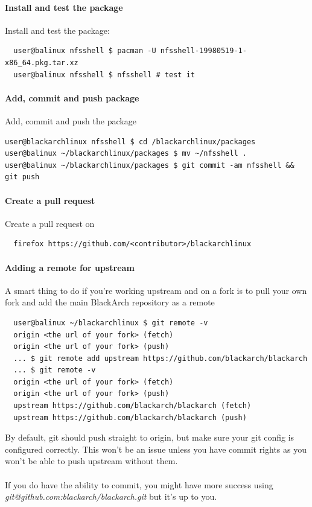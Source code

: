 \documentclass[a4paper, oneside,12pt]{scrartcl}
\def\href#1#2{\htmladdnormallink{#2}{#1}}
\begin{document}
\paragraph{Install and test the package}
Install and test the package:
\begin{lstlisting}
  user@balinux nfsshell $ pacman -U nfsshell-19980519-1-x86_64.pkg.tar.xz
  user@balinux nfsshell $ nfsshell # test it
\end{lstlisting}

\paragraph{Add, commit and push package}
Add, commit and push the package
\begin{lstlisting}user@blackarchlinux nfsshell $ cd /blackarchlinux/packages
user@balinux ~/blackarchlinux/packages $ mv ~/nfsshell .
user@balinux ~/blackarchlinux/packages $ git commit -am nfsshell && git push
\end{lstlisting}

\paragraph{Create a pull request}
Create a pull request on \href{https://github.com/}{github.com}
\begin{lstlisting}
  firefox https://github.com/<contributor>/blackarchlinux
\end{lstlisting}

\paragraph{Adding a remote for upstream}
A smart thing to do if you're working upstream and on a fork is to pull your own fork and add the main BlackArch repository as a remote
\begin{lstlisting}
  user@balinux ~/blackarchlinux $ git remote -v
  origin <the url of your fork> (fetch)
  origin <the url of your fork> (push)
  ... $ git remote add upstream https://github.com/blackarch/blackarch
  ... $ git remote -v
  origin <the url of your fork> (fetch)
  origin <the url of your fork> (push)
  upstream https://github.com/blackarch/blackarch (fetch)
  upstream https://github.com/blackarch/blackarch (push)
\end{lstlisting}
By default, git should push straight to origin, but make sure your git config is
configured correctly. This won't be an issue unless you have commit rights as
you won't be able to push upstream without them.\\
\\
If you do have the ability to commit, you might have more success using\\
\textit{git@github.com:blackarch/blackarch.git} but it's up to you.
\end{document}
